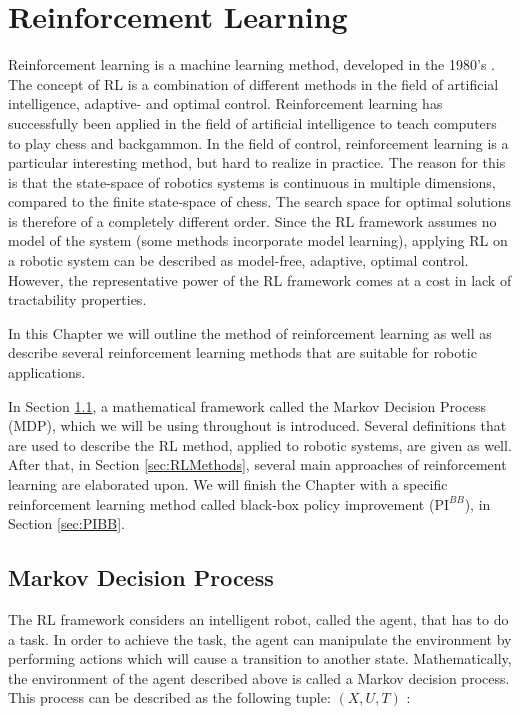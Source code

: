 \documentclass[mscThesis.tex]{subfiles}
\begin{document}
\chapter{Reinforcement Learning}
\label{chap:RL}
Reinforcement learning is a machine learning method, developed in the 1980's \cite{SuttonBarto1998}. The concept of RL is a combination of different methods in the field of artificial intelligence, adaptive- and optimal control. Reinforcement learning has successfully been applied in the field of artificial intelligence to teach computers to play chess and backgammon. In the field of control, reinforcement learning is a particular interesting method, but hard to realize in practice. The reason for this is that the state-space of robotics systems is continuous in multiple dimensions, compared to the finite state-space of chess. The search space for optimal solutions is therefore of a completely different order. Since the RL framework assumes no model of the system (some methods incorporate model learning), applying RL on a robotic system can be described as model-free, adaptive, optimal control. However, the representative power of the RL framework comes at a cost in lack of tractability properties.

In this Chapter we will outline the method of reinforcement learning as well as describe several reinforcement learning methods that are suitable for robotic applications. 

In Section \ref{sec:MDP}, a mathematical framework called the Markov Decision Process (MDP), which we will be using throughout is introduced. Several definitions that are used to describe the RL method, applied to robotic systems, are given as well. After that, in Section \ref{sec:RLMethods}, several main approaches of reinforcement learning are elaborated upon. We will finish the Chapter with a specific reinforcement learning method called black-box policy improvement ($\text{PI}^{BB}$), in Section \ref{sec:PIBB}. 

\section{Markov Decision Process}
\label{sec:MDP}

The RL framework considers an intelligent robot, called the agent, that has to do a task. In order to achieve the task, the agent can manipulate the environment by performing actions which will cause a transition to another state. Mathematically, the environment of the agent described above is called a Markov decision process. This process can be described as the following tuple: $(X, U, T)$ \cite{SuttonBarto1998}:
\end{document}
